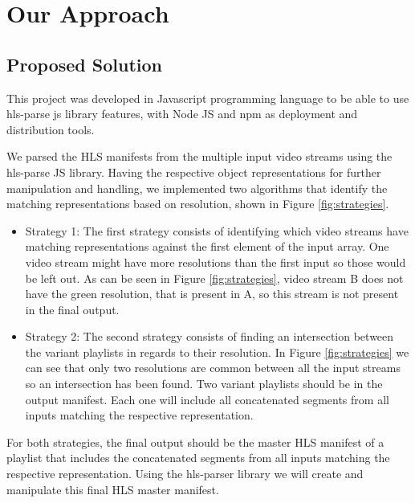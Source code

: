 \section{\textbf{Our Approach}}\label{sec:main}
\subsection{ Proposed Solution}

This project was developed in Javascript programming language to be able to use hls-parse js library features, with Node JS and npm as deployment and distribution tools. 

We parsed the HLS manifests from the multiple input video streams using the hls-parse JS library. Having the respective object representations for further manipulation and handling, we implemented two algorithms that identify the matching representations based on resolution, shown in Figure \ref{fig:strategies}.

 \begin{itemize}

     \item Strategy 1: The first strategy consists of identifying which video streams have matching representations against the first element of the input array. One video stream might have more resolutions than the first input so those would be left out. As can be seen in Figure \ref{fig:strategies}, video stream B does not have the green resolution, that is present in A, so this stream is not present in the final output.

     \item  Strategy 2: The second strategy consists of finding an intersection between the variant playlists in regards to their resolution. In Figure \ref{fig:strategies} we can see that only two resolutions are common between all the input streams so an intersection has been found. Two variant playlists should be in the output manifest. Each one will include all concatenated segments from all inputs matching the respective representation.


 \end{itemize}
 
 For both strategies, the final output should be the master HLS manifest of a playlist that includes the concatenated segments from all inputs matching the respective representation. Using the hls-parser library we will create and manipulate this final HLS master manifest.

